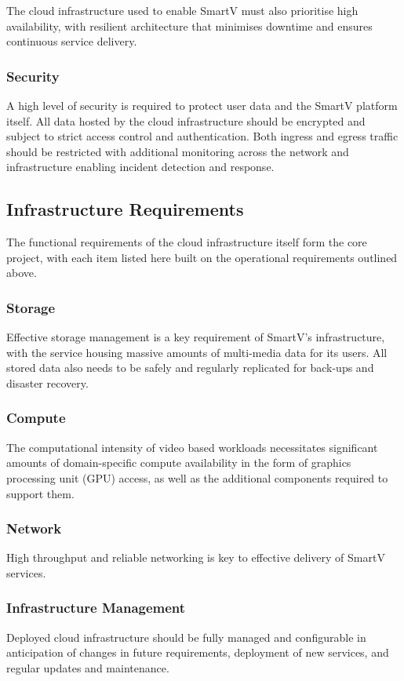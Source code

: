 The cloud infrastructure used to enable SmartV must also prioritise high availability, with resilient architecture that minimises downtime and ensures continuous service delivery. 

\subsubsection*{Security}

A high level of security is required to protect user data and the SmartV platform itself. All data hosted by the cloud infrastructure should be encrypted and subject to strict access control and authentication. Both ingress and egress traffic should be restricted with additional monitoring across the network and infrastructure enabling incident detection and response. 

\subsection{Infrastructure Requirements}

The functional requirements of the cloud infrastructure itself form the core project, with each item listed here built on the operational requirements outlined above.

\subsubsection*{Storage}

Effective storage management is a key requirement of SmartV's infrastructure, with the service housing massive amounts of multi-media data for its users. All stored data also needs to be safely and regularly replicated for back-ups and disaster recovery.


\subsubsection*{Compute}

The computational intensity of video based workloads necessitates significant amounts of domain-specific compute availability in the form of graphics processing unit (GPU) access, as well as the additional components required to support them. 

\subsubsection*{Network}

High throughput and reliable networking is key to effective delivery of SmartV services.

\subsubsection*{Infrastructure Management}

Deployed cloud infrastructure should be fully managed and configurable in anticipation of changes in future requirements, deployment of new services, and regular updates and maintenance.
